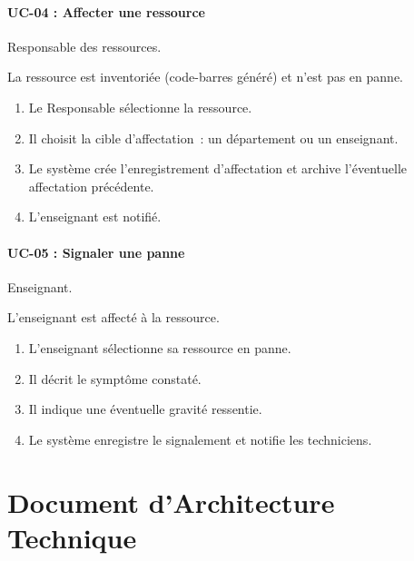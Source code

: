 \documentclass[a4paper,11pt,openany]{report}
\begin{document}
\subsection{UC-04 : Affecter une ressource}
\begin{description}[leftmargin=*]
  \item[Acteur principal] Responsable des ressources.
  \item[Précondition] La ressource est inventoriée
    (code-barres généré) et n'est pas en panne.
  \item[Scénario nominal]
    \begin{enumerate}
      \item Le Responsable sélectionne la ressource.
      \item Il choisit la cible d'affectation~: un département
        ou un enseignant.
      \item Le système crée l'enregistrement d'affectation et
        archive l'éventuelle affectation précédente.
      \item L'enseignant est notifié.
    \end{enumerate}
\end{description}

\subsection{UC-05 : Signaler une panne}
\begin{description}[leftmargin=*]
  \item[Acteur principal] Enseignant.
  \item[Précondition] L'enseignant est affecté à la ressource.
  \item[Scénario nominal]
    \begin{enumerate}
      \item L'enseignant sélectionne sa ressource en panne.
      \item Il décrit le symptôme constaté.
      \item Il indique une éventuelle gravité ressentie.
      \item Le système enregistre le signalement et notifie
        les techniciens.
    \end{enumerate}
\end{description}

\part{Document d'Architecture Technique}
\end{document}

